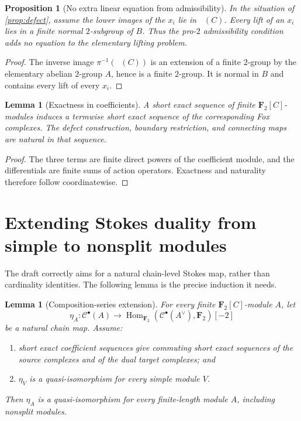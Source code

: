 \documentclass[11pt,reqno]{amsart}
\newtheorem{proposition}[theorem]{Proposition}
\newtheorem{lemma}[theorem]{Lemma}
\theoremstyle{remark}
\numberwithin{equation}{section}
\newcommand{\F}{\mathbf F}
\newcommand{\Hom}{\operatorname{Hom}}
\newcommand{\cC}{\mathcal C}
\DeclareMathOperator{\Otwo}{O_2}
\begin{document}
\begin{proposition}[No extra linear equation from admissibility]
\label{prop:no-extra}
In the situation of \cref{prop:defect}, assume the lower images of the
\(x_i\) lie in \(\Otwo(C)\).  Every lift of an \(x_i\) lies in a finite
normal \(2\)-subgroup of \(B\).  Thus the pro-\(2\) admissibility condition
adds no equation to the elementary lifting problem.
\end{proposition}

\begin{proof}
The inverse image \(\pi^{-1}(\Otwo(C))\) is an extension of a finite
\(2\)-group by the elementary abelian \(2\)-group \(A\), hence is a finite
\(2\)-group.  It is normal in \(B\) and contains every lift of every
\(x_i\).
\end{proof}

\begin{lemma}[Exactness in coefficients]\label{lem:coeff-exact}
A short exact sequence of finite \(\F_2[C]\)-modules induces a termwise
short exact sequence of the corresponding Fox complexes.  The defect
construction, boundary restriction, and connecting maps are natural in
that sequence.
\end{lemma}

\begin{proof}
The three terms are finite direct powers of the coefficient module, and
the differentials are finite sums of action operators.  Exactness and
naturality therefore follow coordinatewise.
\end{proof}

\section{Extending Stokes duality from simple to nonsplit modules}

The draft correctly aims for a natural chain-level Stokes map, rather than
cardinality identities.  The following lemma is the precise induction it
needs.

\begin{lemma}[Composition-series extension]\label{lem:composition}
For every finite \(\F_2[C]\)-module \(A\), let
\[
 \eta_A:\cC^\bullet(A)\longrightarrow
 \Hom_{\F_2}(\cC^\bullet(A^\vee),\F_2)[-2]
\]
be a natural chain map.  Assume:
\begin{enumerate}
\item short exact coefficient sequences give commuting short exact
sequences of the source complexes and of the dual target complexes; and
\item \(\eta_V\) is a quasi-isomorphism for every simple module \(V\).
\end{enumerate}
Then \(\eta_A\) is a quasi-isomorphism for every finite-length module
\(A\), including nonsplit modules.
\end{lemma}
\end{document}
